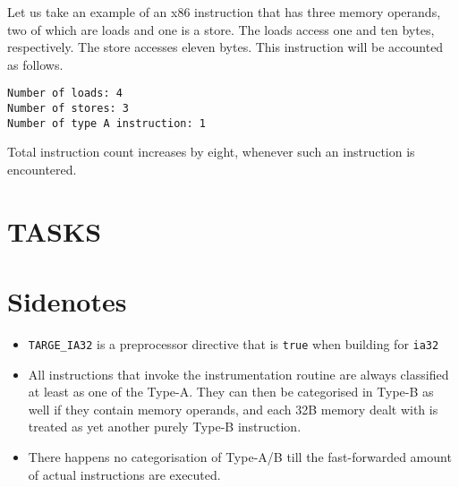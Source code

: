 \documentclass{article}
\begin{document}
Let us take an example of an x86 instruction that has three memory operands, two of which are loads and one is a store. The loads access one and ten bytes, respectively. The store accesses eleven bytes. This instruction will be accounted as follows.

\vspace{10pt}
\noindent
\texttt{Number of loads:   4}\\
\texttt{Number of stores:   3}\\
\texttt{Number of type A instruction:  1}
\vspace{10pt}

\noindent
Total instruction count increases by eight, whenever such an instruction is encountered.

\newpage
{}
\section*{TASKS}


\pagebreak

\pagebreak

\pagebreak

\pagebreak
\noindent

\section*{Sidenotes}
\begin{itemize}
    \item \texttt{TARGE\_IA32} is a preprocessor directive that is \texttt{true} when building for \texttt{ia32}
    \item All instructions that invoke the instrumentation routine are always classified at least as one of the Type-A. They can then be categorised in Type-B as well if they contain memory operands, and each 32B memory dealt with is treated as yet another purely Type-B instruction.
    \item There happens no categorisation of Type-A/B till the fast-forwarded amount of actual instructions are executed.
\end{itemize}
\end{document}
